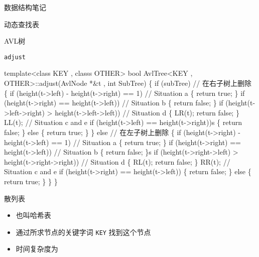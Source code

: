\documentclass[
  ignorenonframetext,
]{beamer}
\newenvironment{Shaded}{}{}
\newcommand{\NormalTok}[1]{#1}
\providecommand{\tightlist}{%
  \setlength{\itemsep}{0pt}\setlength{\parskip}{0pt}}
\begin{document}
\begin{frame}[fragile]{数据结构笔记}
\begin{block}{动态查找表}
\begin{block}{AVL树}
\begin{block}{\texttt{adjust}}
\begin{Shaded}
\begin{Highlighting}[]
\NormalTok{template\textless{}class KEY , classs OTHER\textgreater{}}
\NormalTok{bool AvlTree\textless{}KEY , OTHER\textgreater{}::adjust(AvlNode *\&t , int SubTree)}
\NormalTok{\{}
\NormalTok{  if (subTree) // 在右子树上删除}
\NormalTok{  \{}
\NormalTok{    if (height(t{-}\textgreater{}left) {-} height(t{-}\textgreater{}right) == 1) // Situation a}
\NormalTok{    \{}
\NormalTok{      return true;}
\NormalTok{    \}}
\NormalTok{    if (height(t{-}\textgreater{}right) == height(t{-}\textgreater{}left)) // Situation b}
\NormalTok{    \{}
\NormalTok{      return false;}
\NormalTok{    \}}
\NormalTok{    if (height(t{-}\textgreater{}left{-}\textgreater{}right) \textgreater{} height(t{-}\textgreater{}left{-}\textgreater{}left)) // Situation d}
\NormalTok{    \{}
\NormalTok{      LR(t);}
\NormalTok{      return false; }
\NormalTok{    \}}
\NormalTok{    LL(t); // Situation c and e}
\NormalTok{    if (height(t{-}\textgreater{}left) == height(t{-}\textgreater{}right))s}
\NormalTok{    \{}
\NormalTok{      return false;}
\NormalTok{    \}}
\NormalTok{    else}
\NormalTok{    \{}
\NormalTok{      return true;}
\NormalTok{    \}}
\NormalTok{  \}}
\NormalTok{  else // 在左子树上删除}
\NormalTok{  \{}
\NormalTok{    if (height(t{-}\textgreater{}right) {-} height(t{-}\textgreater{}left) == 1) // Situation a}
\NormalTok{    \{}
\NormalTok{      return true;}
\NormalTok{    \}}
\NormalTok{    if (height(t{-}\textgreater{}right) == height(t{-}\textgreater{}left)) // Situation b}
\NormalTok{    \{}
\NormalTok{      return false;}
\NormalTok{    \}s}
\NormalTok{    if (height(t{-}\textgreater{}right{-}\textgreater{}left) \textgreater{} height(t{-}\textgreater{}right{-}\textgreater{}right)) // Situation d}
\NormalTok{    \{}
\NormalTok{      RL(t);}
\NormalTok{      return false;}
\NormalTok{    \}}
\NormalTok{    RR(t); // Situation c and e}
\NormalTok{    if (height(t{-}\textgreater{}right) == height(t{-}\textgreater{}left))}
\NormalTok{    \{}
\NormalTok{      return false;}
\NormalTok{    \}}
\NormalTok{    else}
\NormalTok{    \{}
\NormalTok{      return true;}
\NormalTok{    \}}
\NormalTok{  \}}
\NormalTok{\}}
\end{Highlighting}
\end{Shaded}
\end{block}
\end{block}

\begin{block}{散列表}
\protect{}\label{ux6563ux5217ux8868}
\begin{itemize}
\tightlist
\item
  也叫哈希表
\item
  通过所求节点的关键字词 \texttt{KEY} 找到这个节点
\item
  时间复杂度为 {}
\end{itemize}


\end{block}
\end{block}
\end{frame}
\end{document}
